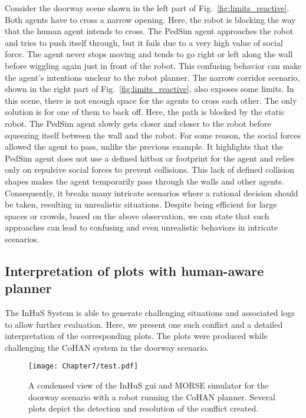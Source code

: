 Consider the doorway scene shown in the left part of Fig.~\ref{fig:limits_reactive}. Both agents have to cross a narrow opening. Here, the robot is blocking the way that the human agent intends to cross. The PedSim agent approaches the robot and tries to push itself through, but it fails due to a very high value of social force. The agent never stops moving and tends to go right or left along the wall before wiggling again just in front of the robot. 
This confusing behavior can make the agent's intentions unclear to the robot planner. 
The narrow corridor scenario, shown in the right part of Fig.~\ref{fig:limits_reactive}, also exposes some limits. In this scene, there is not enough space for the agents to cross each other. The only solution is for one of them to back off. Here, the path is blocked by the static robot. The PedSim agent slowly gets closer and closer to the robot before squeezing itself between the wall and the robot. For some reason, the social forces allowed the agent to pass, unlike the previous example. It highlights that the PedSim agent does not use a defined hitbox or footprint for the agent and relies only on repulsive social forces to prevent collisions. This lack of defined collision shapes makes the agent temporarily pass through the walls and other agents. Consequently, it breaks many intricate scenarios where a rational decision should be taken, resulting in unrealistic situations. Despite being efficient for large spaces or crowds, based on the above observation, we can state that such approaches can lead to confusing and even unrealistic behaviors in intricate scenarios.  

\subsection{Interpretation of plots with human-aware planner}

The InHuS System is able to generate challenging situations 
and associated logs to allow further evaluation.
Here, we present one such conflict and a detailed interpretation of the corresponding plots. The plots were produced while challenging the CoHAN system in the doorway scenario.

\begin{figure}
    \centering
    \texttt{[image: Chapter7/test.pdf]}
    
    \caption{
    A condensed view of the InHuS \acrshort{gui} and MORSE simulator for the doorway scenario with a robot running the CoHAN planner. Several plots depict the detection and resolution of the conflict created. 
    }
    \label{fig:cohan_passage_block}
    \vspace{-0.3cm}
\end{figure}


